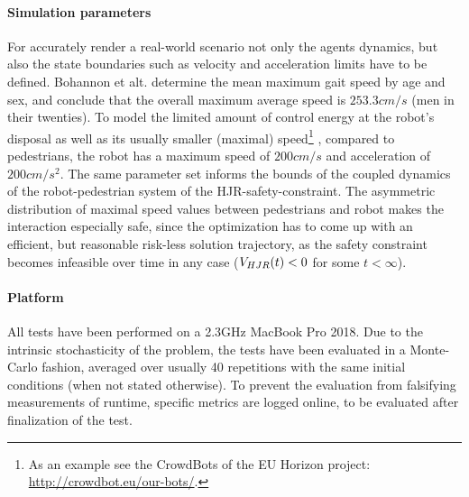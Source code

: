 \paragraph{Simulation parameters}
For accurately render a real-world scenario not only the agents dynamics, but also the state boundaries such as velocity and acceleration limits have to be defined. Bohannon et alt. \cite{Bohannon1997} determine the mean maximum gait speed by age and sex, and conclude that the overall maximum average speed is $253.3 cm/s$ (men in their twenties). To model the limited amount of control energy at the robot's disposal as well as its usually smaller (maximal) speed\footnote{As an example see the CrowdBots of the EU Horizon project: \href{http://crowdbot.eu/our-bots/}{http://crowdbot.eu/our-bots/}.} , compared to pedestrians, the robot has a maximum speed of $200 cm/s$ and acceleration of $200 cm/s^2$. The same parameter set informs the bounds of the coupled dynamics of the robot-pedestrian system of the \ac{HJR}-safety-constraint. The asymmetric distribution of maximal speed values between pedestrians and robot makes the interaction especially safe, since the optimization has to come up with an efficient, but reasonable risk-less solution trajectory, as the safety constraint becomes infeasible over time in any case ($V_{HJR}(t) < 0$ for some $t < \infty$).

\paragraph{Platform} 
All tests have been performed on a 2.3GHz MacBook Pro 2018. Due to the intrinsic stochasticity of the problem, the tests have been evaluated in a Monte-Carlo fashion, averaged over usually 40 repetitions with the same initial conditions (when not stated otherwise). To prevent the evaluation from falsifying measurements of runtime, specific metrics are logged online, to be evaluated after finalization of the test.